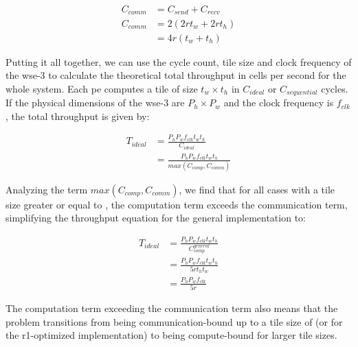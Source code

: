 \begin{equation}
    \label{eq:c_comm}
    \begin{aligned}
        C_{comm} &= C_{send} + C_{recv} \\
        C_{comm} &= 2\left(2 r t_w + 2 r t_h\right) \\
        &= 4r\left(t_w+t_h\right)
    \end{aligned}
\end{equation}

Putting it all together, we can use the cycle count, tile size and clock frequency of the \ac{wse}-3 to calculate the theoretical total throughput in cells per second for the whole system. Each \ac{pe} computes a tile of size $t_w \times t_h$ in $C_{ideal}$ or $C_{sequential}$ cycles. If the physical dimensions of the \ac{wse}-3 are $P_h \times P_w$ and the clock frequency is $f_{clk}$, the total throughput is given by:

\begin{equation}
    \label{eq:throughput_ideal}
    \begin{aligned}
        T_{ideal} &= \frac{P_h P_w f_{clk} t_w t_h}{C_{ideal}} \\
        &= \frac{P_h P_w f_{clk} t_w t_h}{max\left(C_{comp}, C_{comm}\right)}
    \end{aligned}
\end{equation}

Analyzing the term $max\left(C_{comp}, C_{comm}\right)$, we find that for all cases with a tile size greater or equal to , the computation term exceeds the communication term, simplifying the throughput equation for the general implementation to:

\begin{equation}
    \label{eq:throughput_ideal_simplified}
    \begin{aligned}
        T_{ideal} &= \frac{P_h P_w f_{clk} t_w t_h}{C_{comp}^{general}} \\
        &= \frac{P_h P_w f_{clk} t_w t_h}{5r t_h t_w} \\
        &= \frac{P_h P_w f_{clk}}{5r}
    \end{aligned}
\end{equation}

The computation term exceeding the communication term also means that the problem transitions from being communication-bound up to a tile size of  (or  for the r1-optimized implementation) to being compute-bound for larger tile sizes.

